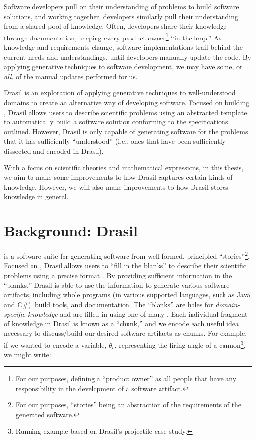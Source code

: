Software developers pull on their understanding of problems to build software
solutions, and working together, developers similarly pull their understanding
from a shared pool of knowledge. Often, developers share their knowledge through
documentation, keeping every product owner\footnote{For our purposes, defining a
``product owner'' as all people that have any responsibility in the development
of a software artifact.} ``in the loop.'' As knowledge and requirements change,
software implementations trail behind the current needs and understandings,
until developers manually update the code. By applying generative techniques to
software development, we may have some, or \textit{all}, of the manual updates
performed for us.

Drasil \cite{Drasil2021} is an exploration of applying generative techniques to
well-understood domains to create an alternative way of developing software.
Focused on building , Drasil allows users to describe scientific
problems using an abstracted  template to automatically build a
software solution conforming to the specifications outlined. However, Drasil is
only capable of generating software for the problems that it has sufficiently
``understood'' (i.e., ones that have been sufficiently dissected and encoded in
Drasil).

With a focus on scientific theories and mathematical expressions, in this
thesis, we aim to make some improvements to how Drasil captures certain kinds of
knowledge. However, we will also make improvements to how Drasil stores
knowledge in general.

\section{Background: Drasil}
\label{chap:introduction:sec:background}

 is a software suite
for generating software from well-formed, principled ``stories''\footnote{For
our purposes, ``stories'' being an abstraction of the requirements of the
generated software.}. Focused on , Drasil allows users to ``fill in the
blanks'' to describe their scientific problems using a precise  format
\cite{SmithAndLai2005}. By providing sufficient information in the ``blanks,''
Drasil is able to use the information to generate various software artifacts,
including whole programs (in various supported languages, such as Java and C\#),
build tools, and documentation. The ``blanks'' are holes for
\textit{domain-specific knowledge} and are filled in using one of many
. Each individual fragment of knowledge in Drasil is known as a
``chunk,'' and we encode each useful idea necessary to discuss/build our desired
software artifacts as chunks. For example, if we wanted to encode a variable,
\(\theta{}_{c}\), representing the firing angle of a cannon\footnote{Running
example based on Drasil's \acs{projectile} case study.}, we might write:

